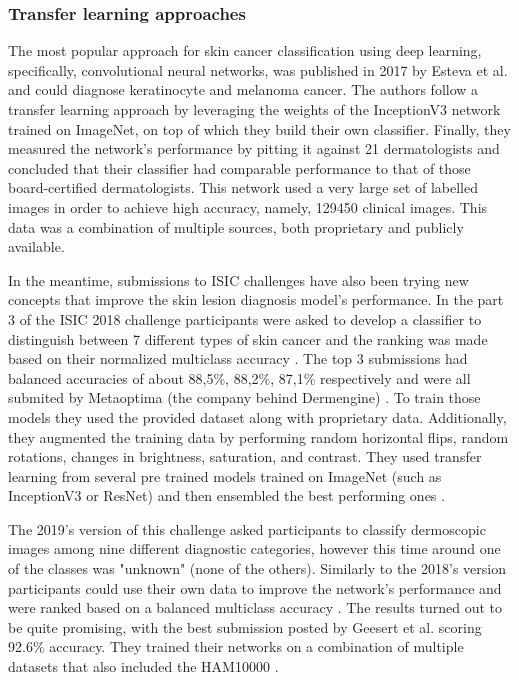 \documentclass[journal,compsoc]{IEEEtran}
\begin{document}
\subsubsection{Transfer learning approaches}
The most popular approach for skin cancer classification using deep learning, specifically, convolutional neural networks, was published in 2017 by Esteva et al.\cite{Esteva2017} and could diagnose keratinocyte and melanoma cancer. The authors follow a transfer learning approach by leveraging the weights of the InceptionV3 network trained on ImageNet, on top of which they build their own classifier. Finally, they measured the network's performance by pitting it against 21 dermatologists and concluded that their classifier had comparable performance to that of those board-certified dermatologists. This network used a very large set of labelled images in order to achieve high accuracy, namely, 129450 clinical images. This data was a combination of multiple sources, both proprietary and publicly available. \par
In the meantime, submissions to ISIC challenges have also been trying new concepts that improve the skin lesion diagnosis model's performance. In the part 3 of the ISIC 2018 challenge participants were asked to develop a classifier to distinguish between 7 different types of skin cancer and the ranking was made based on their normalized multiclass accuracy \cite{isic2018}. The top 3 submissions had balanced accuracies of about 88,5\%, 88,2\%, 87,1\% respectively and were all submited by Metaoptima (the company behind Dermengine) \cite{isic2018top3}. To train those models they used the provided dataset along with proprietary data. Additionally, they augmented the training data by performing random horizontal flips, random rotations, changes in brightness, saturation, and contrast. They used transfer learning from several pre trained models trained on ImageNet (such as InceptionV3 or ResNet) and then ensembled the best performing ones \cite{isic2018top3}. \par
The 2019's version of this challenge asked participants to classify dermoscopic images among nine different diagnostic categories, however this time around one of the classes was "unknown" (none of the others). Similarly to the 2018's version participants could use their own data to improve the network's performance and were ranked based on a balanced multiclass accuracy \cite{isic2019}. The results turned out to be quite promising, with the best submission posted by Geesert et al. \cite{isic2019first} scoring 92.6\% accuracy. They trained their networks on a combination of multiple datasets that also included the HAM10000 \cite{ham10000}. \par
\end{document}
